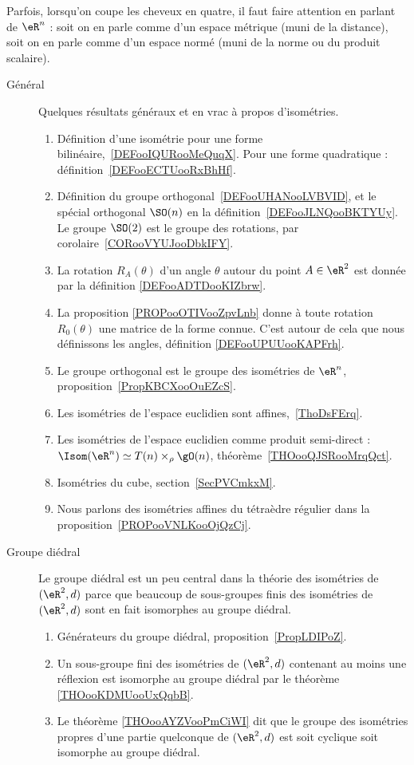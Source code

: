 Parfois, lorsqu'on coupe les cheveux en quatre, il faut faire attention en parlant de \( \eR^n\) : soit on en parle comme d'un espace métrique (muni de la distance), soit on en parle comme d'un espace normé (muni de la norme ou du produit scalaire).

\begin{description}
    \item[Général] 
        Quelques résultats généraux et en vrac à propos d'isométries.
\begin{enumerate}
    \item
        Définition d'une isométrie pour une forme bilinéaire,~\ref{DEFooIQURooMeQuqX}. Pour une forme quadratique : définition~\ref{DEFooECTUooRxBhHf}.
    \item
        Définition du groupe orthogonal~\ref{DEFooUHANooLVBVID}, et le spécial orthogonal \( \SO(n)\) en la définition~\ref{DEFooJLNQooBKTYUy}. Le groupe \( \SO(2)\) est le groupe des rotations, par corolaire~\ref{CORooVYUJooDbkIFY}.
    \item
        La rotation \( R_A(\theta)\) d'un angle \( \theta\) autour du point \( A\in \eR^2\) est donnée par la définition \ref{DEFooADTDooKIZbrw}.
    \item
        La proposition \ref{PROPooOTIVooZpvLnb} donne à toute rotation \( R_0(\theta)\) une matrice de la forme connue. C'est autour de cela que nous définissons les angles, définition \ref{DEFooUPUUooKAPFrh}.
    \item
        Le groupe orthogonal est le groupe des isométries de \( \eR^n\), proposition~\ref{PropKBCXooOuEZcS}.
    \item
        Les isométries de l'espace euclidien sont affines,~\ref{ThoDsFErq}.
    \item
        Les isométries de l'espace euclidien comme produit semi-direct : $\Isom(\eR^n)\simeq T(n)\times_{\rho}\gO(n)$, théorème~\ref{THOooQJSRooMrqQct}.
    \item
        Isométries du cube, section~\ref{SecPVCmkxM}.
    \item
        Nous parlons des isométries affines du tétraèdre régulier dans la proposition~\ref{PROPooVNLKooOjQzCj}.
\end{enumerate}

    \item[Groupe diédral]
        Le groupe diédral est un peu central dans la théorie des isométries de \( (\eR^2,d)\) parce que beaucoup de sous-groupes finis des isométries de \( (\eR^2,d)\) sont en fait isomorphes au groupe diédral.
        \begin{enumerate}
    \item
        Générateurs du groupe diédral, proposition~\ref{PropLDIPoZ}.
    \item
        Un sous-groupe fini des isométries de \( (\eR^2,d)\) contenant au moins une réflexion est isomorphe au groupe diédral par le théorème \ref{THOooKDMUooUxQqbB}.
    \item
        Le théorème \ref{THOooAYZVooPmCiWI} dit que le groupe des isométries propres d'une partie quelconque de \( (\eR^2,d)\) est soit cyclique soit isomorphe au groupe diédral.
        \end{enumerate}
        

\end{description}

